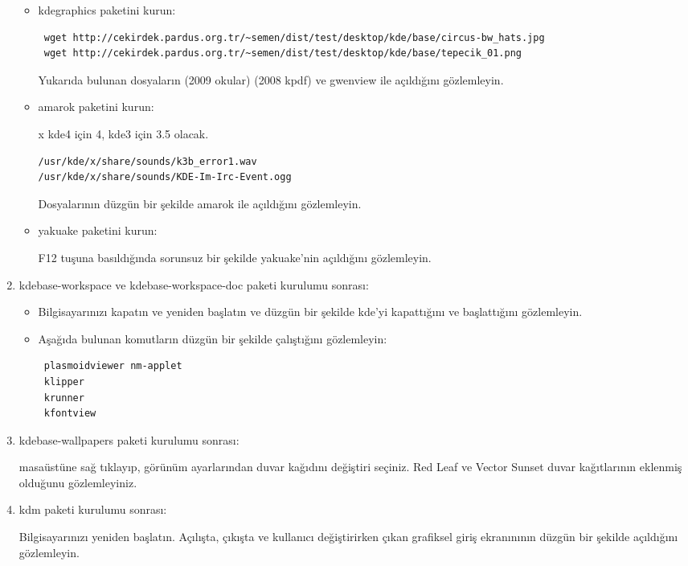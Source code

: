 \documentclass[a4paper,10pt]{article}
\begin{document}
\begin{enumerate}
\begin{itemize}
 \item kdegraphics paketini kurun:
\begin{verbatim}	
 wget http://cekirdek.pardus.org.tr/~semen/dist/test/desktop/kde/base/circus-bw_hats.jpg
 wget http://cekirdek.pardus.org.tr/~semen/dist/test/desktop/kde/base/tepecik_01.png
\end{verbatim}
Yukarıda bulunan dosyaların (2009 okular) (2008 kpdf) ve gwenview ile açıldığını gözlemleyin.
\item amarok paketini kurun:

x kde4 için 4, kde3 için 3.5 olacak.
\begin{verbatim}
/usr/kde/x/share/sounds/k3b_error1.wav
/usr/kde/x/share/sounds/KDE-Im-Irc-Event.ogg
\end{verbatim}

Dosyalarının düzgün bir şekilde amarok ile açıldığını gözlemleyin.

\item yakuake paketini kurun:

F12 tuşuna basıldığında sorunsuz bir şekilde yakuake'nin açıldığını gözlemleyin.
\end{itemize}
\item kdebase-workspace ve kdebase-workspace-doc paketi kurulumu sonrası:
\begin{itemize}

 \item Bilgisayarınızı kapatın ve yeniden başlatın ve düzgün bir şekilde kde'yi kapattığını ve başlattığını gözlemleyin.

 \item Aşağıda bulunan komutların düzgün bir şekilde çalıştığını gözlemleyin:
\begin{verbatim}
 plasmoidviewer nm-applet 
 klipper
 krunner
 kfontview
\end{verbatim}

\end{itemize}

\item kdebase-wallpapers paketi kurulumu sonrası:

masaüstüne sağ tıklayıp, görünüm ayarlarından duvar kağıdını değiştiri seçiniz. Red Leaf ve Vector Sunset duvar kağıtlarının eklenmiş olduğunu gözlemleyiniz.

\item kdm paketi kurulumu sonrası:

Bilgisayarınızı yeniden başlatın. Açılışta, çıkışta ve kullanıcı değiştirirken çıkan grafiksel giriş ekranınının düzgün bir şekilde açıldığını gözlemleyin.


\end{enumerate}
\end{document}
